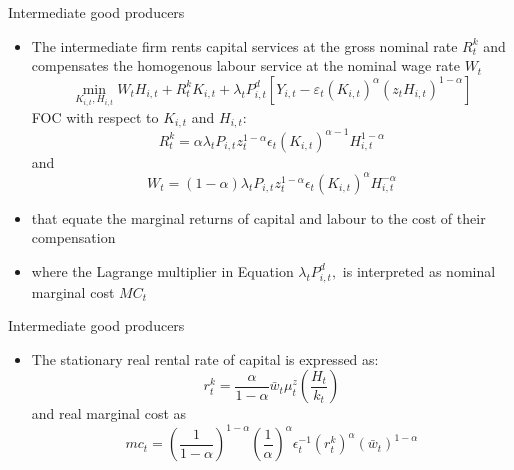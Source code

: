 \documentclass[9pt]{beamer}
\begin{document}
\begin{frame}{Intermediate good producers}
\begin{itemize}
    \item The intermediate firm rents capital services at the gross nominal rate $R_{t}^{k}$ and compensates the homogenous labour service at the nominal wage rate $W_{t} $ 
$$
    \min _{K_{i, t}, H_{i, t}} W_{t} H_{i, t}+R_{t}^{k} K_{i, t}+\lambda_{t} P_{i, t}^{d}\left[Y_{i, t}-\varepsilon_{t}\left(K_{i, t}\right)^{\alpha}\left(z_{t} H_{i, t}\right)^{1-\alpha} \right]
$$
FOC with respect to $K_{i, t}$ and $H_{i, t}$:
$$
    R_{t}^{k}=\alpha \lambda_{t} P_{i, t} z_{t}^{1-\alpha} \epsilon_{t}\left(K_{i, t}\right)^{\alpha-1} H_{i, t}^{1-\alpha}
$$
and
$$
    W_{t}=(1-\alpha) \lambda_{t} P_{i, t} z_{t}^{1-\alpha} \epsilon_{t}\left(K_{i, t}\right)^{\alpha} H_{i, t}^{-\alpha}
$$

\item that equate the marginal returns of capital and labour to the cost of their compensation

\item where the Lagrange multiplier in Equation $\lambda_{t} P_{i, t}^{d},$ is interpreted as nominal marginal cost $M C_{t}$
    
    
    
    
\end{itemize}


\end{frame}
\begin{frame}{Intermediate good producers}
\begin{itemize}
    \item The stationary real rental rate of capital is expressed as:
$$
r_{t}^{k}=\frac{\alpha}{1-\alpha} \bar{w}_{t} \mu_{t}^{z}\left(\frac{H_{t}}{k_{t}}\right)
$$
and real marginal cost as
$$
m c_{t}=\left(\frac{1}{1-\alpha}\right)^{1-\alpha}\left(\frac{1}{\alpha}\right)^{\alpha} \epsilon_{t}^{-1}\left(r_{t}^{k}\right)^{\alpha}\left(\bar{w}_{t}\right)^{1-\alpha}
$$
    
    
    
\end{itemize}


\end{frame}
\end{document}
